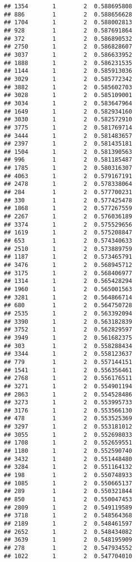 \documentclass[
]{article}
\begin{document}
\begin{verbatim}
## 1354       1        2  0.588695808
## 886        1        2  0.588656628
## 1704       1        2  0.588002813
## 928        1        2  0.587691864
## 372        1        2  0.586890532
## 2750       1        2  0.586828607
## 3037       1        2  0.586633952
## 1888       1        2  0.586231535
## 1144       1        2  0.585913036
## 3029       1        2  0.585772342
## 3882       1        2  0.585602703
## 3028       1        2  0.585109001
## 3034       1        2  0.583647964
## 1649       1        2  0.582934160
## 3030       1        2  0.582572910
## 3775       1        2  0.581769714
## 3444       1        2  0.581483657
## 2397       1        2  0.581435181
## 1504       1        2  0.581390563
## 996        1        2  0.581185487
## 1785       1        2  0.580316307
## 4063       1        2  0.579167191
## 2478       1        2  0.578338064
## 284        1        2  0.577700231
## 330        1        2  0.577425478
## 1868       1        2  0.577267559
## 2267       1        2  0.576036189
## 3374       1        2  0.575529656
## 1619       1        2  0.575208847
## 653        1        2  0.574340633
## 2510       1        2  0.573889759
## 1187       1        2  0.573465791
## 3476       1        2  0.568945712
## 3175       1        2  0.568406977
## 1314       1        2  0.565428294
## 1960       1        2  0.565001563
## 3281       1        2  0.564866714
## 680        1        2  0.564750728
## 2535       1        2  0.563392094
## 3390       1        2  0.563182839
## 3752       1        2  0.562829597
## 3949       1        2  0.561682375
## 303        1        2  0.558288434
## 3344       1        2  0.558123637
## 779        1        2  0.557144151
## 1541       1        2  0.556356461
## 2768       1        2  0.556176511
## 3271       1        2  0.554901194
## 2863       1        2  0.554528486
## 3273       1        2  0.553995733
## 3176       1        2  0.553566130
## 478        1        2  0.553525369
## 3297       1        2  0.553181012
## 3055       1        2  0.552698033
## 1708       1        2  0.552659551
## 1180       1        2  0.552590740
## 3432       1        2  0.551448480
## 3284       1        2  0.551164132
## 198        1        2  0.550748933
## 1085       1        2  0.550665137
## 289        1        2  0.550321844
## 850        1        2  0.550047453
## 2809       1        2  0.549119589
## 3718       1        2  0.548564368
## 2189       1        2  0.548461597
## 2652       1        2  0.548434082
## 3639       1        2  0.548195909
## 278        1        2  0.547934552
## 1022       1        2  0.547704010

\end{verbatim}
\end{document}
